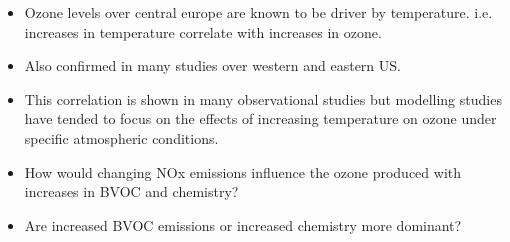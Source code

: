 \begin{BlueBox}
    \vskip-1cm
    \begin{block}{}
        \begin{itemize}
            \item Ozone levels over central europe are known to be driver by temperature. i.e. increases in temperature correlate with increases in ozone.
            \item Also confirmed in many studies over western and eastern US.
            \item This correlation is shown in many observational studies but modelling studies have tended to focus on the effects of increasing temperature on ozone under specific atmospheric conditions.
            \item How would changing NOx emissions influence the ozone produced with increases in BVOC and chemistry?
            \item Are increased BVOC emissions or increased chemistry more dominant?
        \end{itemize}
    \end{block}
\end{BlueBox}
